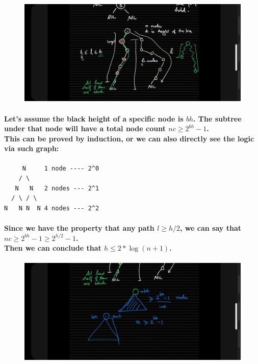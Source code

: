 \documentclass{article}
\begin{document}
\begin{figure}[H]
    \includegraphics[width=\textwidth]{hrelated.jpg}
\end{figure}

\paragraph{
    Let's assume the black height of a specific node is $bh$. The subtree under that node will have a total node count $nc \geq 2^{bh} - 1$.\\
    This can be proved by induction, or we can also directly see the logic via such graph:\\
}

\begin{verbatim}
     N     1 node ---- 2^0
    / \    
   N   N   2 nodes --- 2^1
  / \ / \
N   N N  N 4 nodes --- 2^2
\end{verbatim}  

\paragraph{
    Since we have the property that any path $l \geq h/2$, we can say that $nc \geq 2^{bh} - 1 \geq 2^{h/2} - 1$.\\
    Then we can conclude that $h \leq 2*\log(n+1)$.\\
}

\begin{figure}[H]
    \includegraphics[width=\textwidth]{bhrelated.jpg}
\end{figure}
\end{document}
